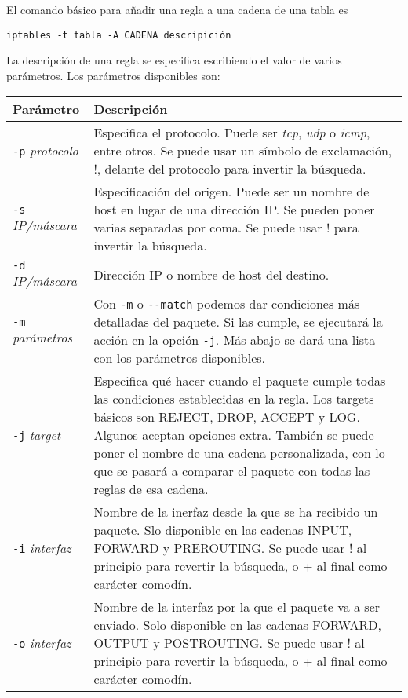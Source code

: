 El comando básico para añadir una regla a una cadena de una tabla es

\begin{lstlisting}
iptables -t tabla -A CADENA descripición
\end{lstlisting}

La descripción de una regla se especifica escribiendo el valor de varios parámetros. Los parámetros disponibles son:

\begin{longtable}{p{} | p{}}
\textbf{Parámetro} & \textbf{Descripción}\\\hline
\lstinline!-p! \textit{protocolo} & Especifica el protocolo. Puede ser \textit{tcp}, \textit{udp} o \textit{icmp}, entre otros. Se puede usar un símbolo de exclamación, !, delante del protocolo para invertir la búsqueda.\\\hline
\lstinline!-s! \textit{IP/máscara} & Especificación del origen. Puede ser un nombre de host en lugar de una dirección IP. Se pueden poner varias separadas por coma. Se puede usar ! para invertir la búsqueda.\\\hline
\lstinline!-d! \textit{IP/máscara} & Dirección IP o nombre de host del destino.\\\hline
\lstinline!-m! \textit{parámetros} & Con \lstinline!-m! o \lstinline!--match! podemos dar condiciones más detalladas del paquete. Si las cumple, se ejecutará la acción en la opción \lstinline!-j!. Más abajo se dará una lista con los parámetros disponibles.\\\hline
\lstinline!-j! \textit{target} & Especifica qué hacer cuando el paquete cumple todas las condiciones establecidas en la regla. Los targets básicos son REJECT, DROP, ACCEPT y LOG. Algunos aceptan opciones extra. También se puede poner el nombre de una cadena personalizada, con lo que se pasará a comparar el paquete con todas las reglas de esa cadena.\\\hline
\lstinline!-i! \textit{interfaz} & Nombre de la inerfaz desde la que se ha recibido un paquete. Slo disponible en las cadenas INPUT, FORWARD y PREROUTING. Se puede usar ! al principio para revertir la búsqueda, o + al final como carácter comodín.\\\hline
\lstinline!-o! \textit{interfaz} & Nombre de la interfaz por la que el paquete va a ser enviado. Solo disponible en las cadenas FORWARD, OUTPUT y POSTROUTING. Se puede usar ! al principio para revertir la búsqueda, o + al final como carácter comodín.\\
\end{longtable}


